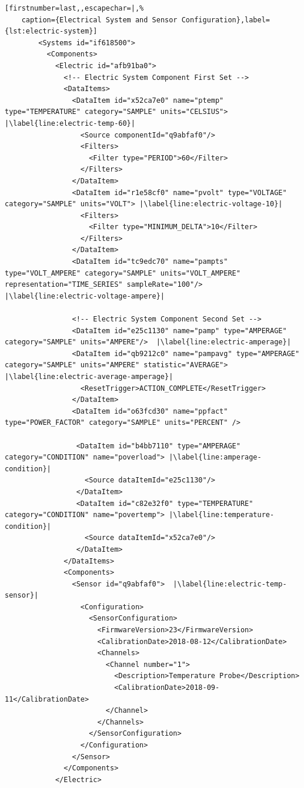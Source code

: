 \begin{lstlisting}[firstnumber=last,,escapechar=|,%
    caption={Electrical System and Sensor Configuration},label={lst:electric-system}]
        <Systems id="if618500">
          <Components>
            <Electric id="afb91ba0">
              <!-- Electric System Component First Set -->
              <DataItems>
                <DataItem id="x52ca7e0" name="ptemp" type="TEMPERATURE" category="SAMPLE" units="CELSIUS">  |\label{line:electric-temp-60}|
                  <Source componentId="q9abfaf0"/>
                  <Filters>
                    <Filter type="PERIOD">60</Filter>
                  </Filters>
                </DataItem>
                <DataItem id="r1e58cf0" name="pvolt" type="VOLTAGE" category="SAMPLE" units="VOLT"> |\label{line:electric-voltage-10}|
                  <Filters>
                    <Filter type="MINIMUM_DELTA">10</Filter>
                  </Filters>
                </DataItem>
                <DataItem id="tc9edc70" name="pampts" type="VOLT_AMPERE" category="SAMPLE" units="VOLT_AMPERE" representation="TIME_SERIES" sampleRate="100"/>  |\label{line:electric-voltage-ampere}|
                
                <!-- Electric System Component Second Set -->
                <DataItem id="e25c1130" name="pamp" type="AMPERAGE" category="SAMPLE" units="AMPERE"/>  |\label{line:electric-amperage}|
                <DataItem id="qb9212c0" name="pampavg" type="AMPERAGE" category="SAMPLE" units="AMPERE" statistic="AVERAGE">  |\label{line:electric-average-amperage}|
                  <ResetTrigger>ACTION_COMPLETE</ResetTrigger>
                </DataItem>
                <DataItem id="o63fcd30" name="ppfact" type="POWER_FACTOR" category="SAMPLE" units="PERCENT" />
                
                 <DataItem id="b4bb7110" type="AMPERAGE" category="CONDITION" name="poverload"> |\label{line:amperage-condition}|
                   <Source dataItemId="e25c1130"/>
                 </DataItem>
                 <DataItem id="c82e32f0" type="TEMPERATURE" category="CONDITION" name="povertemp"> |\label{line:temperature-condition}|
                   <Source dataItemId="x52ca7e0"/>
                 </DataItem>
              </DataItems>
              <Components>
                <Sensor id="q9abfaf0">  |\label{line:electric-temp-sensor}|
                  <Configuration>
                    <SensorConfiguration>
                      <FirmwareVersion>23</FirmwareVersion>
                      <CalibrationDate>2018-08-12</CalibrationDate>
                      <Channels>
                        <Channel number="1">
                          <Description>Temperature Probe</Description>
                          <CalibrationDate>2018-09-11</CalibrationDate>
                        </Channel>
                      </Channels>
                    </SensorConfiguration>
                  </Configuration>
                </Sensor>              
              </Components>
            </Electric>
\end{lstlisting}

